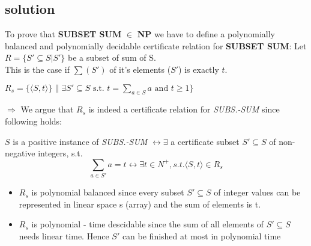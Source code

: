 \subsection{solution}

To prove that \textbf{SUBSET SUM} $\in$ \textbf{NP} we have to define a polynomially balanced and 
polynomially decidable certificate relation for \textbf{SUBSET SUM}:
\newline
\newline
Let $R=\{S'\subseteq S | S'\}$ be a subset of sum of S. \\
This is the case if $\sum (S')$ of it's elements ($S'$) is exactly $t$.
\newline\newline


$R_s = \{\langle S,t\rangle\} \| \exists S' \subseteq S \text{ s.t. } t = \sum_{a \in S}a \text{ and } t \geq 1\}$

\noindent $\Rightarrow$ 
We argue that $R_s$ is indeed a certificate relation for \textit{SUBS.-SUM} 
since following holds:

\noindent $S$ is a positive instance of \textit{SUBS.-SUM} $\leftrightarrow \exists$ a certificate
subset $S' \subseteq S$ of non-negative integers, s.t.
$$\sum_{a \in S'}a = t \leftrightarrow \exists t \in N^{+}, s.t. \langle S,t\rangle\in R_s$$

\begin{itemize}
 \item $R_s$ is polynomial balanced since every subset $S' \subseteq S$ of
integer values can be represented in linear space s (array) and
the sum of elements is t.
 \item $R_s$ is polynomial - time descidable since the sum of all elements 
of $S' \subseteq S$ needs linear time. Hence $S'$ can be finished at most in 
polynomial time
\end{itemize}
